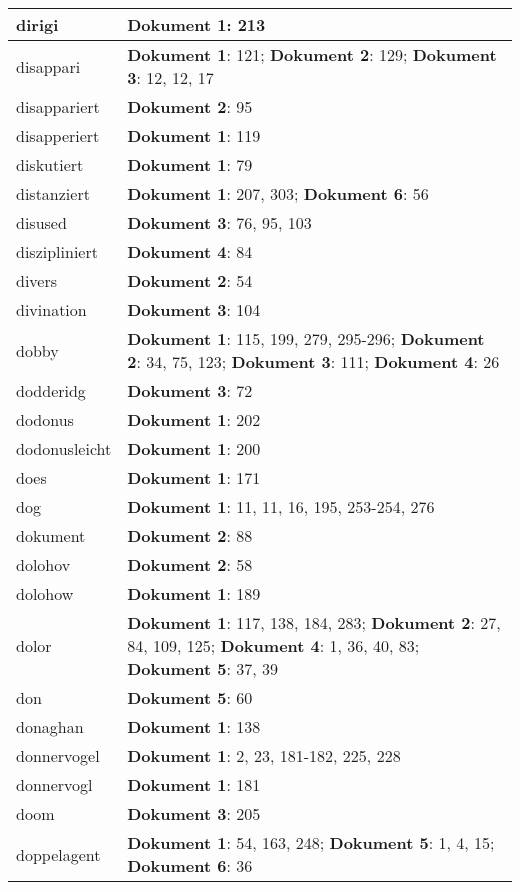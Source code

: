 \documentclass[a5paper]{article}
\begin{document}
\begin{longtable}[l]{|l|p{3in}|}
\hline
dirigi & \textbf{Dokument 1}: 213 \\
\hline
disappari & \textbf{Dokument 1}: 121; \textbf{Dokument 2}: 129; \textbf{Dokument 3}: 12, 12, 17 \\
\hline
disappariert & \textbf{Dokument 2}: 95 \\
\hline
disapperiert & \textbf{Dokument 1}: 119 \\
\hline
diskutiert & \textbf{Dokument 1}: 79 \\
\hline
distanziert & \textbf{Dokument 1}: 207, 303; \textbf{Dokument 6}: 56 \\
\hline
disused & \textbf{Dokument 3}: 76, 95, 103 \\
\hline
diszipliniert & \textbf{Dokument 4}: 84 \\
\hline
divers & \textbf{Dokument 2}: 54 \\
\hline
divination & \textbf{Dokument 3}: 104 \\
\hline
dobby & \textbf{Dokument 1}: 115, 199, 279, 295-296; \textbf{Dokument 2}: 34, 75, 123; \textbf{Dokument 3}: 111; \textbf{Dokument 4}: 26 \\
\hline
dodderidg & \textbf{Dokument 3}: 72 \\
\hline
dodonus & \textbf{Dokument 1}: 202 \\
\hline
dodonusleicht & \textbf{Dokument 1}: 200 \\
\hline
does & \textbf{Dokument 1}: 171 \\
\hline
dog & \textbf{Dokument 1}: 11, 11, 16, 195, 253-254, 276 \\
\hline
dokument & \textbf{Dokument 2}: 88 \\
\hline
dolohov & \textbf{Dokument 2}: 58 \\
\hline
dolohow & \textbf{Dokument 1}: 189 \\
\hline
dolor & \textbf{Dokument 1}: 117, 138, 184, 283; \textbf{Dokument 2}: 27, 84, 109, 125; \textbf{Dokument 4}: 1, 36, 40, 83; \textbf{Dokument 5}: 37, 39 \\
\hline
don & \textbf{Dokument 5}: 60 \\
\hline
donaghan & \textbf{Dokument 1}: 138 \\
\hline
donnervogel & \textbf{Dokument 1}: 2, 23, 181-182, 225, 228 \\
\hline
donnervogl & \textbf{Dokument 1}: 181 \\
\hline
doom & \textbf{Dokument 3}: 205 \\
\hline
doppelagent & \textbf{Dokument 1}: 54, 163, 248; \textbf{Dokument 5}: 1, 4, 15; \textbf{Dokument 6}: 36 \\

\end{longtable}
\end{document}
